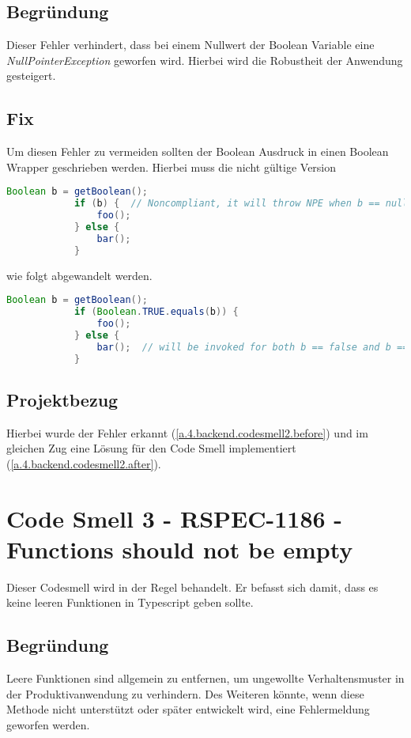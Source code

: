 		\subsection{Begründung}
		Dieser Fehler verhindert, dass bei einem Nullwert der Boolean Variable eine \textit{NullPointerException} geworfen wird. Hierbei wird die Robustheit der Anwendung gesteigert.
		
		\subsection{Fix}
		Um diesen Fehler zu vermeiden sollten der Boolean Ausdruck in einen Boolean Wrapper geschrieben werden. Hierbei muss die nicht gültige Version 
		
		\begin{lstlisting}[language=java,caption={Non Compliant Version - Codesmell 1},gobble=11]
			Boolean b = getBoolean();
			if (b) {  // Noncompliant, it will throw NPE when b == null
				foo();
			} else {
				bar();
			}
		\end{lstlisting}
	
		wie folgt abgewandelt werden.
	
		\begin{lstlisting}[language=java,caption={Compliant Version - Codesmell 1},gobble=11]
			Boolean b = getBoolean();
			if (Boolean.TRUE.equals(b)) {
				foo();
			} else {
				bar();  // will be invoked for both b == false and b == null
			}
		\end{lstlisting}
	
		\subsection{Projektbezug}
		Hierbei wurde der Fehler erkannt (\cref{a.4.backend.codesmell2.before}) und im gleichen Zug eine Lösung für den Code Smell implementiert (\cref{a.4.backend.codesmell2.after}).
		
	
	\section{Code Smell 3 - RSPEC-1186 - Functions should not be empty \cite{codeSmell3.sonar}}
	Dieser Codesmell wird in der Regel  behandelt. Er befasst sich damit, dass es keine leeren Funktionen in Typescript geben sollte.
		\subsection{Begründung}
		Leere Funktionen sind allgemein zu entfernen, um ungewollte Verhaltensmuster in der Produktivanwendung zu verhindern. Des Weiteren könnte, wenn diese Methode nicht unterstützt oder später entwickelt wird, eine Fehlermeldung geworfen werden. 
		
